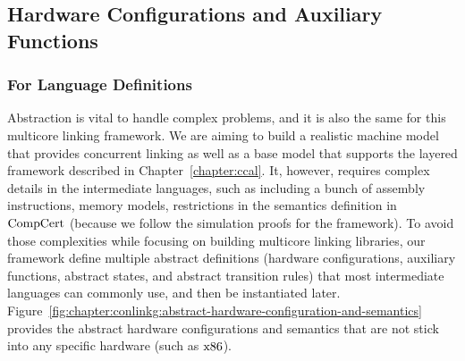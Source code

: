 \subsection{Hardware Configurations and Auxiliary Functions}
\label{chapter:linking:subsec:hardware-configuration}

\subsubsection{For Language Definitions}

Abstraction is vital to handle complex problems, and it is also the same for this multicore linking framework.
We are aiming to build a realistic machine model that provides 
concurrent linking as well as a base model that supports 
the layered framework described in Chapter~\ref{chapter:ccal}.
It, however, requires complex details in the intermediate languages, 
such as including a bunch of assembly instructions, memory models, 
restrictions in the semantics definition in $\mathrm{CompCert}$ (because we follow 
the simulation proofs for the framework).
To avoid those complexities while focusing on building multicore linking  libraries,
our framework define multiple abstract definitions (hardware configurations, auxiliary functions, 
abstract states, and abstract transition rules)
that most intermediate languages can commonly use, 
and then be instantiated later. 
Figure~\ref{fig:chapter:conlinkg:abstract-hardware-configuration-and-semantics} provides the 
abstract hardware configurations and semantics that are
not stick into any specific hardware (such as $\mathrm{x86}$).

